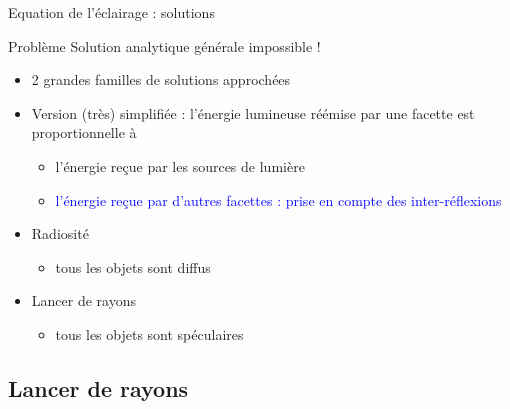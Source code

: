 \begin{frame}{Equation de l'éclairage : solutions}
\begin{block}{Problème}
    Solution analytique générale impossible !
\end{block}
\begin{itemize}
    \item 2 grandes familles de solutions approchées
    \item Version (très) simplifiée : l'énergie lumineuse réémise par une facette est proportionnelle  à
    \begin{itemize}
        \item l'énergie reçue par les sources de lumière 
        \item \textcolor{blue}{l'énergie reçue par d'autres facettes : prise en compte des inter-réflexions}
    \end{itemize}
    \item Radiosité 
    \begin{itemize}
        \item tous les objets sont diffus 
    \end{itemize}
    \item Lancer de rayons 
    \begin{itemize}
        \item tous les objets sont spéculaires 
    \end{itemize}
\end{itemize}
\end{frame}

\subsection{Lancer de rayons}

